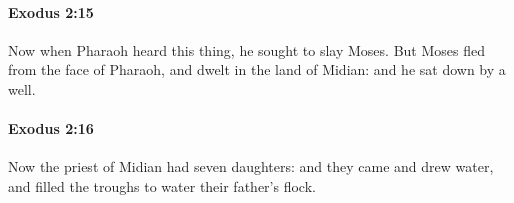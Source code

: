 		\paragraph{Exodus 2:15} %
			\label{EXODUS-2-15}

			Now when Pharaoh heard this thing, he sought to slay Moses. But Moses fled from the face of Pharaoh, and dwelt in the land of Midian: and he sat down by a well.


		\paragraph{Exodus 2:16} %
			\label{EXODUS-2-16}

			Now the priest of Midian had seven daughters: and they came and drew water, and filled the troughs to water their father's flock.


